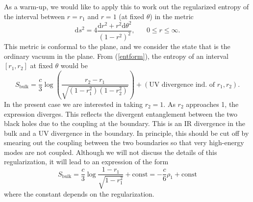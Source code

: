 \documentclass[12pt]{article}
\newcommand{\be}{\begin{equation}}
\newcommand{\ee}{\end{equation}}
\numberwithin{equation}{section}
\begin{document}
As a warm-up, we would like to apply this to work out the regularized entropy of the interval between $r = r_1$ and $r = 1$ (at fixed $\theta$) in the metric
\be
\mathrm{d}s^2 = 4\frac{\mathrm{d}r^2 + r^2\mathrm{d}\theta^2}{(1-r^2)^2}, \hspace{20pt} 0\le r \le \infty.
\ee
This metric is conformal to the plane, and we consider the state that is the ordinary vacuum in the plane. From (\ref{entform}), the entropy of an interval $[r_1,r_2]$ at fixed $\theta$ would be
\be
S_{\text{bulk}} = \frac{c}{3}\log\left(\frac{r_2-r_1}{\sqrt{(1-r_1^2)(1-r_2^2)}}\right) + (\text{UV divergence ind. of $r_1,r_2$}).
\ee
In the present case we are interested in taking $r_2 = 1$. As $r_2$ approaches 1, the expression diverges. This reflects the divergent entanglement between the two black holes due to the coupling at the boundary. This is an IR divergence in the bulk and a UV divergence in the boundary. In principle, this should be cut off by smearing out the coupling between the two boundaries so that very high-energy modes are not coupled. Although we will not discuss the details of this regularization, it will lead to an expression of the form
\be
S_{\text{bulk}} = \frac{c}{3}\log\frac{1-r_1}{\sqrt{1-r_1^2}} + \text{const} = -\frac{c}{6}\rho_1 + \text{const}
\ee
where the constant depends on the regularization.
\end{document}
